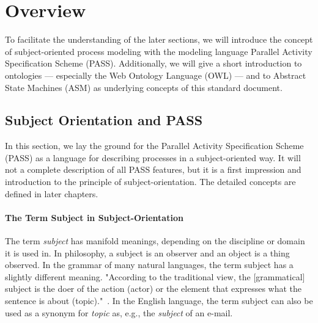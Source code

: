 
\chapter{Overview}


To facilitate the understanding of the later sections, we will introduce the concept of subject-oriented process modeling with the modeling language Parallel Activity Specification Scheme (PASS). Additionally, we will give a short introduction to ontologies --- especially the Web Ontology Language (OWL) --- and to Abstract State Machines (ASM) as underlying concepts of this standard document.

\section{Subject Orientation and PASS}
\label{SubjectOrient} 



In this section, we lay the ground for the Parallel Activity Specification Scheme (PASS) as a language for describing processes in a subject-oriented way. It will not a complete description of all PASS features, but it is a first impression and introduction to the principle of subject-orientation. The detailed concepts are defined in later chapters.

\subsubsection{The Term Subject in Subject-Orientation}

The term \textit{subject} has manifold meanings, depending on the discipline or domain it is used in. In philosophy, a subject is an observer and an object is a thing observed. In the grammar of many natural languages, the term subject has a slightly different meaning. "According to the traditional view, the [grammatical] subject is the doer of the action (actor) or the element that expresses what the sentence is about (topic)."~\cite{article:GeneralSubject}. In the English language, the term subject can also be used as a synonym for \textit{topic} as, e.g., the \textit{subject} of an e-mail. 

